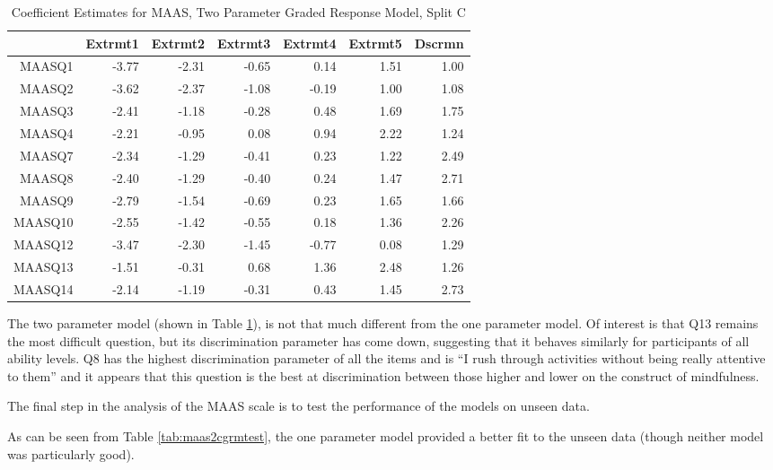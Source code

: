 \documentclass{article}
\begin{document}
\begin{table}[ht]
\centering
\begin{tabular}{rrrrrrr}
  \hline
 & Extrmt1 & Extrmt2 & Extrmt3 & Extrmt4 & Extrmt5 & Dscrmn \\ 
  \hline
MAASQ1 & -3.77 & -2.31 & -0.65 & 0.14 & 1.51 & 1.00 \\ 
  MAASQ2 & -3.62 & -2.37 & -1.08 & -0.19 & 1.00 & 1.08 \\ 
  MAASQ3 & -2.41 & -1.18 & -0.28 & 0.48 & 1.69 & 1.75 \\ 
  MAASQ4 & -2.21 & -0.95 & 0.08 & 0.94 & 2.22 & 1.24 \\ 
  MAASQ7 & -2.34 & -1.29 & -0.41 & 0.23 & 1.22 & 2.49 \\ 
  MAASQ8 & -2.40 & -1.29 & -0.40 & 0.24 & 1.47 & 2.71 \\ 
  MAASQ9 & -2.79 & -1.54 & -0.69 & 0.23 & 1.65 & 1.66 \\ 
  MAASQ10 & -2.55 & -1.42 & -0.55 & 0.18 & 1.36 & 2.26 \\ 
  MAASQ12 & -3.47 & -2.30 & -1.45 & -0.77 & 0.08 & 1.29 \\ 
  MAASQ13 & -1.51 & -0.31 & 0.68 & 1.36 & 2.48 & 1.26 \\ 
  MAASQ14 & -2.14 & -1.19 & -0.31 & 0.43 & 1.45 & 2.73 \\ 
   \hline
\end{tabular}
\caption{Coefficient Estimates for MAAS, Two Parameter Graded Response Model, Split C} 
\label{tab:maas2cgrm2pl}
\end{table}
The two parameter model (shown in Table \ref{tab:maas2cgrm2pl}), is not that much different from the one parameter model. Of interest is that Q13 remains the most difficult question, but its discrimination parameter has come down, suggesting that it behaves similarly for participants of all ability levels. Q8 has the highest discrimination parameter of all the items and is ``I rush through activities without being really attentive to them'' and it appears that this question is the best at discrimination between those higher and lower on the construct of mindfulness. 


The final step in the analysis of the MAAS scale is to test the performance of the models on unseen  data. 


As can be seen from Table \ref{tab:maas2cgrmtest}, the one parameter model provided a better fit to the unseen data (though neither model was particularly good). 
\end{document}
